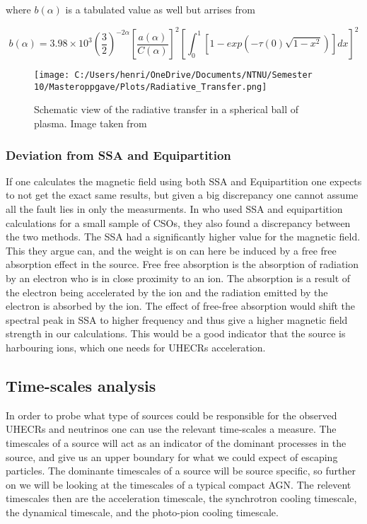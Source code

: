 where $b(\alpha)$ is a tabulated value as well but arrises from 

\begin{equation}
    b(\alpha) = 3.98 \times 10^{3} \left(\frac{3}{2}\right)^{-2\alpha} \left[\frac{a(\alpha)}{C(\alpha)}\right]^{2} \left[\int_0^1[1-exp(-\tau(0)\sqrt{1-x^2})]dx\right]^2
\end{equation}


\begin{figure}
    \centering
    \texttt{[image: C:/Users/henri/OneDrive/Documents/NTNU/Semester 10/Masteroppgave/Plots/Radiative\_Transfer.png]}
    \caption{Schematic view of the radiative transfer in a spherical ball of plasma. Image taken from \cite{Hirotani_2005}}
    \label{fig:Radiative_transfer}
\end{figure}

\subsubsection{Deviation from SSA and Equipartition}
If one calculates the magnetic field using both SSA and Equipartition one expects to not get the exact same results, but given a big discrepancy one cannot assume all the fault lies in only the measurments. In \cite{10.1093/mnras/stt2217} who used SSA and equipartition calculations for a small sample of CSOs, they also found a discrepancy between the two methods. The SSA had a significantly higher value for the magnetic field. This they argue can, and the weight is on can here be induced by a free free absorption effect in the source. Free free absorption is the absorption of radiation by an electron who is in close proximity to an ion. The absorption is a result of the electron being accelerated by the ion and the radiation emitted by the electron is absorbed by the ion. The effect of free-free absorption would shift the spectral peak in SSA to higher frequency and thus give a higher magnetic field strength in our calculations. This would be a good indicator that the source is harbouring ions, which one needs for UHECRs acceleration. 

\subsection{Time-scales analysis}

In order to probe what type of sources could be responsible for the observed UHECRs and neutrinos one can use the relevant time-scales a measure. The timescales of a source will act as an indicator of the dominant processes in the source, and give us an upper boundary for what we could expect of escaping particles. The dominante timescales of a source will be source specific, so further on we will be looking at the timescales of a typical compact AGN. The relevent timescales then are the acceleration timescale, the synchrotron cooling timescale, the dynamical timescale, and the photo-pion cooling timescale. 

